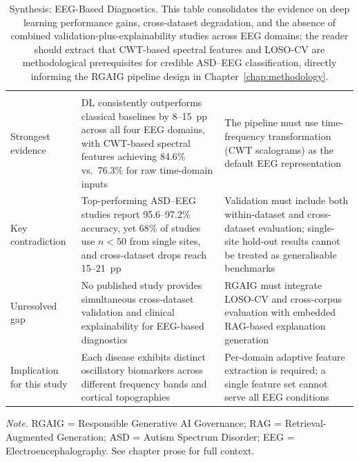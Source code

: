 {\tablestripes\tablefontsize
\begin{xltabular}{\textwidth}{@{} l L L @{}}
\caption[Synthesis: EEG-Based Diagnostics]{Synthesis: EEG-Based Diagnostics. This table consolidates the evidence on deep learning performance gains, cross-dataset degradation, and the absence of combined validation-plus-explainability studies across EEG domains; the reader should extract that CWT-based spectral features and LOSO-CV are methodological prerequisites for credible ASD--EEG classification, directly informing the RGAIG pipeline design in Chapter~\ref{chap:methodology}.}\label{tab:synth_eeg_diagnostics} \\
\toprule
{} &  &  \\
\midrule
\endfirsthead
\toprule
{} &  &  \\
\midrule
\endhead
\bottomrule
\endlastfoot
Strongest evidence & DL consistently outperforms classical baselines by 8--15~pp across all four EEG domains, with CWT-based spectral features achieving 84.6\% vs.\ 76.3\% for raw time-domain inputs & The pipeline must use time-frequency transformation (CWT scalograms) as the default EEG representation \\
\addlinespace
Key contradiction & Top-performing ASD--EEG studies report 95.6--97.2\% accuracy, yet 68\% of studies use $n < 50$ from single sites, and cross-dataset drops reach 15--21~pp & Validation must include both within-dataset and cross-dataset evaluation; single-site hold-out results cannot be treated as generalisable benchmarks \\
\addlinespace
Unresolved gap & No published study provides simultaneous cross-dataset validation and clinical explainability for EEG-based diagnostics & RGAIG must integrate LOSO-CV and cross-corpus evaluation with embedded RAG-based explanation generation \\
\addlinespace
Implication for this study & Each disease exhibits distinct oscillatory biomarkers across different frequency bands and cortical topographies & Per-domain adaptive feature extraction is required; a single feature set cannot serve all EEG conditions \\
\end{xltabular}}
\vspace{0.3em}\noindent\textit{Note.} RGAIG = Responsible Generative AI Governance; RAG = Retrieval-Augmented Generation; ASD = Autism Spectrum Disorder; EEG = Electroencephalography. See chapter prose for full context.

